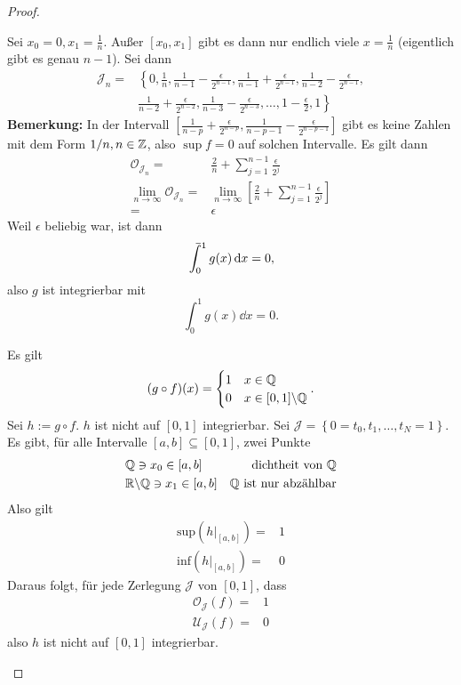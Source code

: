 \begin{proof}
\begin{parts}
		Sei $x_0=0, x_1=\frac{1}{n}$. Außer $[x_0,x_1]$ gibt es dann nur endlich viele $x=\frac{1}{n}$ (eigentlich gibt es genau $n-1$). Sei dann
		\begin{align*}
			\mathcal{J}_n=&\left\{ 0,\frac{1}{n},\frac{1}{n-1}-\frac{\epsilon}{2^{n-1}},\frac{1}{n-1}+\frac{\epsilon}{2^{n-1}} ,\frac{1}{n-2}-\frac{\epsilon}{2^{n-1}},\right.\\
				      &\left. \frac{1}{n-2}+\frac{\epsilon}{2^{n-2}},\frac{1}{n-3}-\frac{\epsilon}{2^{n-3}},\dots, 1-\frac{\epsilon}{2}, 1
				      \right\} 
		\end{align*}
		\textbf{Bemerkung:} In der Intervall $\left[ \frac{1}{n-p}+\frac{\epsilon}{2^{n-p}}, \frac{1}{n-p-1}-\frac{\epsilon}{2^{n-p-1}} \right] $ gibt es keine Zahlen mit dem Form $1 / n, n \in \mathbb{Z}$, also $\sup f=0$ auf solchen Intervalle. Es gilt dann
		\begin{align*}
			\mathcal{O}_{\mathcal{J}_n}=& \frac{2}{n}+\sum_{j=1}^{n-1} \frac{\epsilon}{2^{j}}\\
			\lim_{n \to \infty} \mathcal{O}_{\mathcal{J}_n}=&\lim_{n \to \infty} \left[ \frac{2}{n}+\sum_{j=1}^{n-1} \frac{\epsilon}{2^j} \right] \\
			=&\epsilon
		\end{align*}
		Weil $\epsilon$ beliebig war, ist dann
		\[
		\mathchoice%
    {\mkern13mu\overline{\vphantom{\intop}\mkern7mu}\mkern-20mu}%
    {\mkern7mu\overline{\vphantom{\intop}\mkern7mu}\mkern-14mu}%
    {\mkern7mu\overline{\vphantom{\intop}\mkern7mu}\mkern-14mu}%
    {\mkern7mu\overline{\vphantom{\intop}\mkern7mu}\mkern-14mu}%
    \int_0^1 g(x)\dd{x}=0
		,\]
		also $g$ ist integrierbar mit
		\[
			\int_0^1g(x)\dd{x}=0
		.\] 
	\item Es gilt
		\[
			(g\circ f)(x)=\begin{cases}
				1 & x\in \mathbb{Q}\\
				0 & x\in [0,1] \backslash \mathbb{Q}
			\end{cases}
		.\] 
		Sei $h:=g\circ f$. $h$ ist nicht auf $[0,1]$ integrierbar. Sei $\mathcal{J}=\left\{ 0=t_0,t_1,\dots,t_N=1 \right\} $. Es gibt, f\"{u}r alle Intervalle $[a,b]\subseteq [0,1]$, zwei Punkte
		\begin{align*}
			& \mathbb{Q} \ni x_0 \in [a,b] & \text{dichtheit von }\mathbb{Q}\\
			& \mathbb{R}\backslash \mathbb{Q} \ni  x_1 \in [a,b] & \mathbb{Q}\text{ ist nur abzählbar}
		\end{align*}
		Also gilt
		\begin{align}
			\text{sup}\left( h|_{\left[ a,b \right] } \right) =&1\label{eq:ana2blatt4-1}\\
			\text{inf}\left( h|_{[a,b]} \right)=&0\label{eq:ana2blatt4-2}
		\end{align}
		Daraus folgt, f\"{u}r jede Zerlegung $\mathcal{J}$ von $[0,1]$, dass
		\begin{align*}
			\mathcal{O}_\mathcal{J}(f)=&1\\
			\mathcal{U}_\mathcal{J}(f)=&0
		\end{align*}
		also $h$ ist nicht auf $[0,1]$ integrierbar.\qedhere
	\end{parts}
\end{proof}

